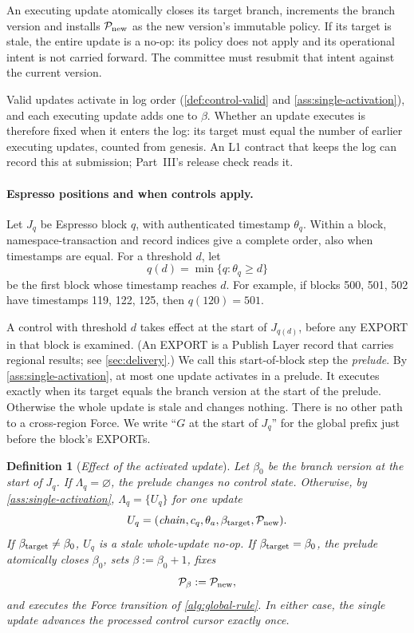 \documentclass[11pt,a4paper]{article}
\newcommand{\defterm}[1]{\textcolor{rrBlue}{\textit{#1}}}
\newtheorem{definition}{Definition}[section]
\begin{document}
An executing update atomically closes its target branch, increments the
branch version and installs $\mathcal P_{\rm new}$ as the new version's
immutable policy.  If its target is stale, the entire update is a no-op:
its policy does not apply and its operational intent is not carried
forward. The committee must resubmit that intent against the current
version.

Valid updates activate in log order (\cref{def:control-valid} and
\cref{ass:single-activation}), and each executing update adds one to
$\beta$. Whether an update executes is therefore fixed when it enters the
log: its target must equal the number of earlier executing updates,
counted from genesis. An L1 contract that keeps the log can record this
at submission; Part~III's release check reads it.

\paragraph{Espresso positions and when controls apply.}
Let $J_q$ be Espresso block $q$, with authenticated timestamp $\theta_q$.
Within a block, namespace-transaction and record indices give a complete
order, also when timestamps are equal. For a threshold $d$, let
\[
 q(d)=\min\{q:\theta_q\ge d\}
\]
be the first block whose timestamp reaches $d$. For example, if blocks
500, 501, 502 have timestamps 119, 122, 125, then $q(120)=501$.

A control with threshold $d$ takes effect at the start of $J_{q(d)}$,
before any EXPORT in that block is examined. (An EXPORT is a Publish
Layer record that carries regional results; see \cref{sec:delivery}.) We
call this start-of-block step the \defterm{prelude}. By
\cref{ass:single-activation}, at most one update activates in a prelude.
It executes exactly when its target equals the branch version at the
start of the prelude. Otherwise the whole update is stale and changes
nothing. There is no other path to a cross-region Force. We write ``$G$
at the start of $J_q$'' for the global prefix just before the block's
EXPORTs.

\begin{definition}[\defterm{Effect of the activated update}]
\label{def:control-effect}
Let $\beta_0$ be the branch version at the start of $J_q$. If
$\Lambda_q=\varnothing$, the prelude changes no control state. Otherwise,
by \cref{ass:single-activation}, $\Lambda_q=\{U_q\}$ for one update
\[
 U_q=(\mathit{chain},c_q,\theta_a,\beta_{\rm target},\mathcal P_{\rm new}).
\]
If $\beta_{\rm target}\ne\beta_0$, $U_q$ is a stale whole-update no-op.
If $\beta_{\rm target}=\beta_0$, the prelude atomically closes $\beta_0$,
sets $\beta:=\beta_0+1$, fixes
\[
 \mathcal P_{\beta}:=\mathcal P_{\rm new},
\]
and executes the Force transition of \cref{alg:global-rule}. In either
case, the single update advances the processed control cursor exactly
once.
\end{definition}
\end{document}

